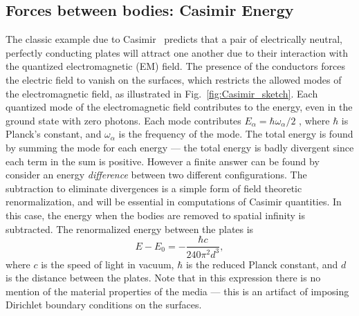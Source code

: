 

\subsection{Forces between bodies: Casimir Energy}

The classic example due to Casimir~\cite{Casimir1948} predicts that a pair of electrically neutral,
perfectly conducting plates will attract one another due to their interaction with the quantized 
electromagnetic (EM) field.  
The presence of the conductors forces the electric field to vanish on the surfaces,
which restricts the allowed modes of the electromagnetic field, as illustrated in Fig.~\ref{fig:Casimir_sketch}.
Each quantized mode of the electromagnetic field contributes
to the energy, even in the ground state with zero photons.  Each mode contributes 
$E_\alpha=\hbar\omega_\alpha/2$ , where $\hbar$ is Planck's  constant, and $\omega_\alpha$ is the frequency of the mode.
The total energy is found by summing the mode for each energy --- the total energy is
badly divergent since each term in the sum is positive.  However a finite answer can 
be found by consider an energy \emph{difference} between two different configurations.  
The subtraction to eliminate divergences is a simple form of field theoretic renormalization, 
and will be essential in computations of Casimir quantities.  
In this case, the energy when the bodies are removed to spatial infinity is subtracted.  
The renormalized energy between the plates is
\begin{equation}
  E-E_0 = -\frac{\hbar c}{240\pi^2 d^3},
\end{equation}
where $c$ is the speed of light in vacuum, $\hbar$ is the reduced Planck constant,
and $d$ is the distance between the plates.  Note that in this expression there is no
mention of the material properties of the media --- this is an artifact of imposing Dirichlet
boundary conditions on the surfaces.  

